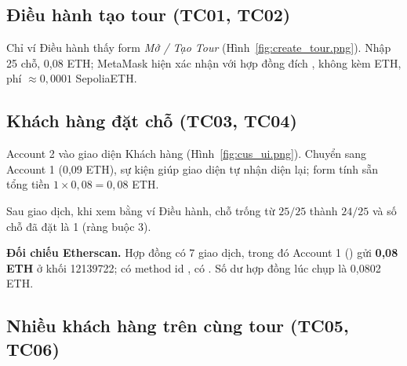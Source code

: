 \subsection{Điều hành tạo tour (TC01, TC02)}

Chỉ ví Điều hành thấy form \emph{Mở / Tạo Tour} (Hình~\ref{fig:create_tour.png}). Nhập 25 chỗ, 0,08 ETH; MetaMask hiện xác nhận với hợp đồng đích
, không kèm ETH, phí $\approx0{,}0001$ SepoliaETH.



\subsection{Khách hàng đặt chỗ (TC03, TC04)}

Account 2 vào giao diện Khách hàng (Hình~\ref{fig:cus_ui.png}). Chuyển sang Account 1 (0,09 ETH), sự kiện 
giúp giao diện tự nhận diện lại; form tính sẵn tổng tiền $1\times0{,}08=0{,}08$ ETH.



Sau giao dịch, khi xem bằng ví Điều hành, chỗ trống từ $25/25$ thành $24/25$ và số chỗ đã đặt là 1 (ràng buộc 3).


\textbf{Đối chiếu Etherscan.} Hợp đồng có 7 giao dịch, trong đó Account 1 () gửi \textbf{0,08 ETH} ở khối 12139722;
 có method id ,  có . Số dư hợp đồng lúc chụp là 0,0802 ETH.


\subsection{Nhiều khách hàng trên cùng tour (TC05, TC06)}

